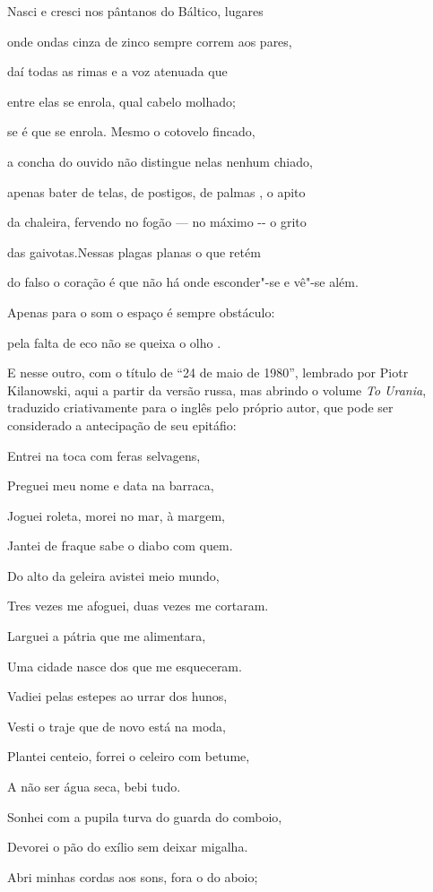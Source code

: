 Nasci e cresci nos pântanos do Báltico, lugares

onde ondas cinza de zinco sempre correm aos pares,

daí todas as rimas e a voz atenuada que

entre elas se enrola, qual cabelo molhado;

se é que se enrola. Mesmo o cotovelo fincado,

a concha do ouvido não distingue nelas nenhum chiado,

apenas bater de telas, de postigos, de palmas , o apito

da chaleira, fervendo no fogão --- no máximo -\/- o grito

das gaivotas.Nessas plagas planas o que retém

do falso o coração é que não há onde esconder"-se e vê"-se além.

Apenas para o som o espaço é sempre obstáculo:

pela falta de eco não se queixa o olho .

E nesse outro, com o título de ``24 de maio de 1980'', lembrado por
Piotr Kilanowski, aqui a partir da versão russa, mas abrindo o volume
\emph{To Urania}, traduzido criativamente para o inglês pelo próprio
autor, que pode ser considerado a antecipação de seu epitáfio:

Entrei na toca com feras selvagens,

Preguei meu nome e data na barraca,

Joguei roleta, morei no mar, à margem,

Jantei de fraque sabe o diabo com quem.

Do alto da geleira avistei meio mundo,

Tres vezes me afoguei, duas vezes me cortaram.

Larguei a pátria que me alimentara,

Uma cidade nasce dos que me esqueceram.

Vadiei pelas estepes ao urrar dos hunos,

Vesti o traje que de novo está na moda,

Plantei centeio, forrei o celeiro com betume,

A não ser água seca, bebi tudo.

Sonhei com a pupila turva do guarda do comboio,

Devorei o pão do exílio sem deixar migalha.

Abri minhas cordas aos sons, fora o do aboio;

